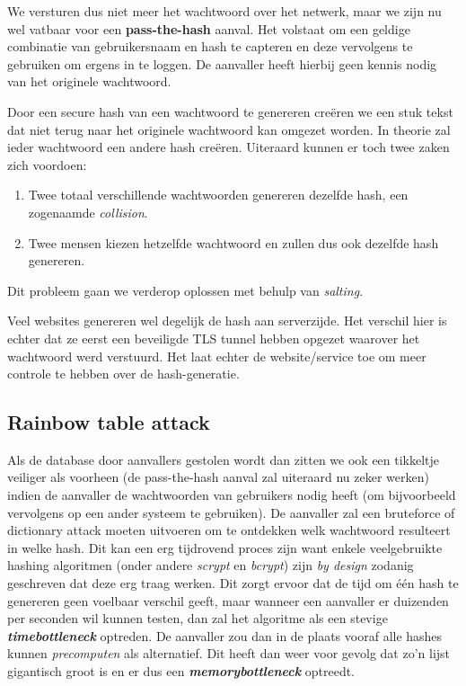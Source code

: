 \documentclass[
  10pt,
  dutch,
  paper=a4,
  ,captions=tableheading
]{scrbook}
\providecommand{\tightlist}{%
  \setlength{\itemsep}{0pt}\setlength{\parskip}{0pt}}
\begin{document}
We versturen dus niet meer het wachtwoord over het netwerk, maar we zijn
nu wel vatbaar voor een \textbf{pass-the-hash} aanval. Het volstaat om
een geldige combinatie van gebruikersnaam en hash te capteren en deze
vervolgens te gebruiken om ergens in te loggen. De aanvaller heeft
hierbij geen kennis nodig van het originele wachtwoord.

\begin{tipblock}
Door een secure hash van een wachtwoord te genereren creëren we een stuk
tekst dat niet terug naar het originele wachtwoord kan omgezet worden.
In theorie zal ieder wachtwoord een andere hash creëren. Uiteraard
kunnen er toch twee zaken zich voordoen:

\begin{enumerate}
\def\labelenumi{\arabic{enumi}.}
\tightlist
\item
  Twee totaal verschillende wachtwoorden genereren dezelfde hash, een
  zogenaamde \emph{collision}.
\item
  Twee mensen kiezen hetzelfde wachtwoord en zullen dus ook dezelfde
  hash genereren.
\end{enumerate}

Dit probleem gaan we verderop oplossen met behulp van \emph{salting}.
\end{tipblock}

\begin{warningblock}
Veel websites genereren wel degelijk de hash aan serverzijde. Het
verschil hier is echter dat ze eerst een beveiligde TLS tunnel hebben
opgezet waarover het wachtwoord werd verstuurd. Het laat echter de
website/service toe om meer controle te hebben over de hash-generatie.
\end{warningblock}

\subsection{Rainbow table attack}\label{rainbow-table-attack}

Als de database door aanvallers gestolen wordt dan zitten we ook een
tikkeltje veiliger als voorheen (de pass-the-hash aanval zal uiteraard
nu zeker werken) indien de aanvaller de wachtwoorden van gebruikers
nodig heeft (om bijvoorbeeld vervolgens op een ander systeem te
gebruiken). De aanvaller zal een bruteforce of dictionary attack moeten
uitvoeren om te ontdekken welk wachtwoord resulteert in welke hash. Dit
kan een erg tijdrovend proces zijn want enkele veelgebruikte hashing
algoritmen (onder andere \emph{scrypt} en \emph{bcrypt}) zijn \emph{by
design} zodanig geschreven dat deze erg traag werken. Dit zorgt ervoor
dat de tijd om één hash te genereren geen voelbaar verschil geeft, maar
wanneer een aanvaller er duizenden per seconden wil kunnen testen, dan
zal het algoritme als een stevige \textbf{\emph{timebottleneck}}
optreden. De aanvaller zou dan in de plaats vooraf alle hashes kunnen
\emph{precomputen} als alternatief. Dit heeft dan weer voor gevolg dat
zo'n lijst gigantisch groot is en er dus een
\textbf{\emph{memorybottleneck}} optreedt.
\end{document}
